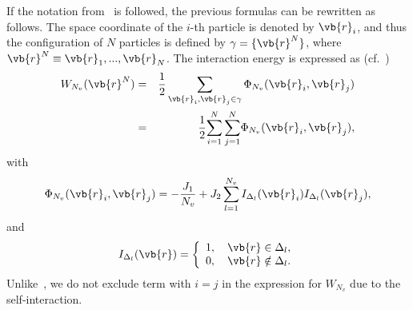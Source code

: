 \begin{mdframed}[linecolor=black,linewidth=1pt,leftline=true]
	If the notation from~\cite{HansenMcDonald13} is followed, the previous formulas can be rewritten as follows. The space coordinate of the $i$-th particle is denoted by $\vb{r}_i$, and thus the configuration of $N$ particles is defined by $\gamma = \{\vb{r}^N\}$, where $\vb{r}^N \equiv \vb{r}_1, ..., \vb{r}_N$. The interaction energy is expressed as (cf.~\cite[eq.~(2.5.16)]{HansenMcDonald13})
	\begin{eqnarray*}
		W_{N_v}(\vb{r}^N) & = & \frac{1}{2} \sum_{\vb{r}_i,\vb{r}_j \in \gamma} \Phi_{N_v} (\vb{r}_i,\vb{r}_j)
		\\
		& = & \frac12 {\sum_{i=1}^N \sum_{j=1}^N} \Phi_{N_v} (\vb{r}_i,\vb{r}_j),
	\end{eqnarray*}
	with
	\begin{equation*}
		\Phi_{N_v}(\vb{r}_i, \vb{r}_j) = -\frac{J_1}{N_v} + J_2\sum_{l=1}^{N_v} I_{\Delta_l}(\vb{r}_i) I_{\Delta_l}(\vb{r}_j),
	\end{equation*}
	and
	\begin{equation*}
		I_{\Delta_l} (\vb{r}) = \left\{
		\begin{array}{ll}
			1, \quad \vb{r} \in \Delta_l,
			\\
			0, \quad \vb{r} \notin \Delta_l.
		\end{array}
		\right.
	\end{equation*}
	Unlike~\cite[eq.~(2.5.16)]{HansenMcDonald13}, we do not exclude term with $i = j$ in the expression for $W_{N_v}$ due to the self-interaction.
\end{mdframed}